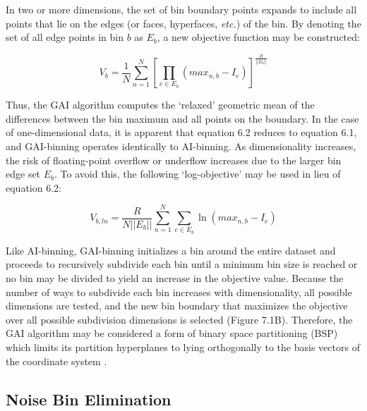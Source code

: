 \begin{doublespace}
In two or more dimensions, the set of bin boundary points expands to include
all points that lie on the edges (or faces, hyperfaces, {\it etc.}) of the bin.
By denoting the set of all edge points in bin $b$ as $E_b$, a new objective
function may be constructed:

\begin{equation}
V_b = \frac{1}{N}
  \sum_{n=1}^N \left[
    \prod_{e \in E_b} (max_{n,b} - I_e)
  \right]^\frac{R}{||E_b||}
\end{equation}

Thus, the GAI algorithm computes the `relaxed' geometric mean of the
differences between the bin maximum and all points on the boundary. In the
case of one-dimensional data, it is apparent that equation 6.2 reduces to
equation 6.1, and GAI-binning operates identically to AI-binning. As
dimensionality increases, the risk of floating-point overflow or underflow
increases due to the larger bin edge set $E_b$. To avoid this, the following
`log-objective' may be used in lieu of equation 6.2:

\begin{equation}
V_{b,ln} = \frac{R}{N ||E_b||}
  \sum_{n=1}^N \sum_{e \in E_b}
    \ln(max_{n,b} - I_e)
\end{equation}

Like AI-binning, GAI-binning initializes a bin around the entire dataset and
proceeds to recursively subdivide each bin until a minimum bin size is reached
or no bin may be divided to yield an increase in the objective value. Because
the number of ways to subdivide each bin increases with dimensionality, all
possible dimensions are tested, and the new bin boundary that maximizes the
objective over all possible subdivision dimensions is selected (Figure 7.1B).
Therefore, the GAI algorithm may be considered a form of binary space
partitioning (BSP) which limits its partition hyperplanes to lying orthogonally
to the basis vectors of the coordinate system \cite{deberg2000}.
\end{doublespace}

\subsection{Noise Bin Elimination}

